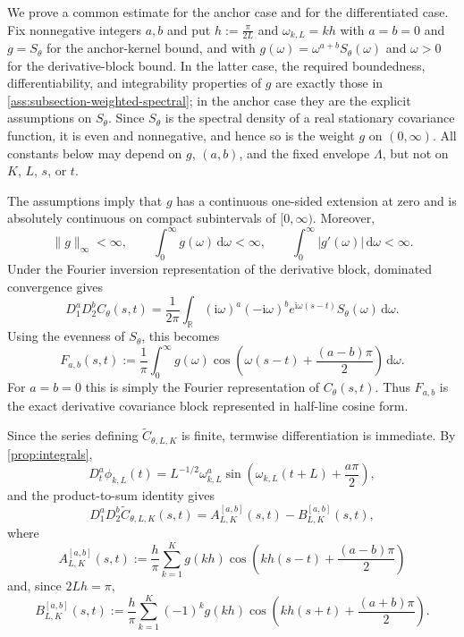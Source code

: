 \documentclass[11pt,a4paper]{article}
\theoremstyle{definition}
\theoremstyle{remark}
\begin{document}
\begin{mainproof}
We prove a common estimate for the anchor case and for the differentiated case. Fix nonnegative integers $a,b$ and put $h:=\frac{\pi}{2L}$ and $\omega_{k,L}=kh$ with $a=b=0$ and $g=S_\theta$ for the anchor-kernel bound, and with $g(\omega)=\omega^{a+b}S_\theta(\omega)$ and $\omega>0$ for the derivative-block bound. In the latter case, the required boundedness, differentiability, and integrability properties of $g$ are exactly those in \cref{ass:subsection-weighted-spectral}; in the anchor case they are the explicit assumptions on $S_\theta$. Since $S_\theta$ is the spectral density of a real stationary covariance function, it is even and nonnegative, and hence so is the weight $g$ on $(0,\infty)$. All constants below may depend on \(g\), \((a,b)\), and the fixed envelope \(\Lambda\), but not on \(K\), \(L\), \(s\), or \(t\).

The assumptions imply that $g$ has a continuous one-sided extension at zero and is absolutely continuous on compact subintervals of $[0,\infty)$. Moreover,
\[
    \|g\|_\infty<\infty,\qquad
    \int_0^\infty g(\omega)\,\mathrm d\omega<\infty,
    \qquad
    \int_0^\infty |g'(\omega)|\,\mathrm d\omega<\infty .
\]
Under the Fourier inversion representation of the derivative block, dominated convergence gives
\[
D_1^aD_2^b C_\theta(s,t)
=
\frac{1}{2\pi}\int_{\mathbb R}
(\mathrm i\omega)^a(-\mathrm i\omega)^b e^{\mathrm i\omega(s-t)}S_\theta(\omega)\,\mathrm d\omega.
\]
Using the evenness of $S_\theta$, this becomes
\[
F_{a,b}(s,t)
:=
\frac{1}{\pi}\int_0^\infty
    g(\omega)
    \cos\!\left(\omega(s-t)+\frac{(a-b)\pi}{2}\right)
\,\mathrm d\omega .
\]
For $a=b=0$ this is simply the Fourier representation of $C_\theta(s,t)$. Thus \(F_{a,b}\) is the exact derivative covariance block represented in half-line cosine form.

Since the series defining $\widetilde C_{\theta,L,K}$ is finite, termwise differentiation is immediate. By \cref{prop:integrals},
\[
D_t^a\phi_{k,L}(t)
=
L^{-1/2}\omega_{k,L}^a
\sin\!\left(\omega_{k,L}(t+L)+\frac{a\pi}{2}\right),
\]
and the product-to-sum identity gives
\[
D_1^aD_2^b\widetilde C_{\theta,L,K}(s,t)
=
A_{L,K}^{[a,b]}(s,t)-B_{L,K}^{[a,b]}(s,t),
\]
where
\[
A_{L,K}^{[a,b]}(s,t)
:=
\frac{h}{\pi}\sum_{k=1}^K
    g(kh)
    \cos\!\left(kh(s-t)+\frac{(a-b)\pi}{2}\right)
\]
and, since $2Lh=\pi$,
\[
B_{L,K}^{[a,b]}(s,t)
:=
\frac{h}{\pi}\sum_{k=1}^K
    (-1)^k g(kh)
    \cos\!\left(kh(s+t)+\frac{(a+b)\pi}{2}\right).
\]


\end{mainproof}
\end{document}
